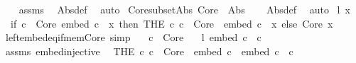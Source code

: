 \begin{isabellebody}
%
\isadelimproof
\ \ %
\endisadelimproof
%
\isatagproof
{}\isamarkupfalse%
\ assms\ \isamarkupfalse%
\ Abs{\isacharunderscore}{\kern0pt}def\ \isamarkupfalse%
\ auto%
\endisatagproof
{\isafoldproof}%
%
\isadelimproof
\isanewline
%
\endisadelimproof
\isanewline
{}\isamarkupfalse%
\ Core{\isacharunderscore}{\kern0pt}subset{\isacharunderscore}{\kern0pt}Abs{\isacharcolon}{\kern0pt}\ {\isachardoublequoteopen}Core\ {\isasymsubseteq}\ Abs{\isachardoublequoteclose}\isanewline
%
\isadelimproof
\ \ %
\endisadelimproof
%
\isatagproof
{}\isamarkupfalse%
\ Abs{\isacharunderscore}{\kern0pt}def\ \isamarkupfalse%
\ auto%
\endisatagproof
{\isafoldproof}%
%
\isadelimproof
\isanewline
%
\endisadelimproof
\isanewline
{}\isamarkupfalse%
\ {\isachardoublequoteopen}l\ x\ {\isasymequiv}\isanewline
\ \ if\ {\isacharparenleft}{\kern0pt}{\isasymexists}c\ {\isasymin}\ Core{\isachardot}{\kern0pt}\ embed\ c\ {\isacharequal}{\kern0pt}\ x{\isacharparenright}{\kern0pt}\ then\ {\isacharparenleft}{\kern0pt}THE\ c{\isachardot}{\kern0pt}\ c\ {\isasymin}\ Core\ {\isasymand}\ embed\ c\ {\isacharequal}{\kern0pt}\ x{\isacharparenright}{\kern0pt}\ else\ {\isasymlangle}Core{\isacharcomma}{\kern0pt}\ x{\isasymrangle}{\isachardoublequoteclose}\isanewline
\isanewline
{}\isamarkupfalse%
\ left{\isacharunderscore}{\kern0pt}embed{\isacharunderscore}{\kern0pt}eq{\isacharunderscore}{\kern0pt}if{\isacharunderscore}{\kern0pt}mem{\isacharunderscore}{\kern0pt}Core\ {\isacharbrackleft}{\kern0pt}simp{\isacharbrackright}{\kern0pt}{\isacharcolon}{\kern0pt}\isanewline
\ \ \ {\isachardoublequoteopen}c\ {\isasymin}\ Core{\isachardoublequoteclose}\isanewline
\ \ \ {\isachardoublequoteopen}l\ {\isacharparenleft}{\kern0pt}embed\ c{\isacharparenright}{\kern0pt}\ {\isacharequal}{\kern0pt}\ c{\isachardoublequoteclose}\isanewline
%
\isadelimproof
%
\endisadelimproof
%
\isatagproof
{}\isamarkupfalse%
\ {\isacharminus}{\kern0pt}\isanewline
\ \ \isamarkupfalse%
\ assms\ embed{\isacharunderscore}{\kern0pt}injective\ \isamarkupfalse%
\ {\isachardoublequoteopen}{\isacharparenleft}{\kern0pt}THE\ c{\isacharprime}{\kern0pt}{\isachardot}{\kern0pt}\ c{\isacharprime}{\kern0pt}\ {\isasymin}\ Core\ {\isasymand}\ embed\ c{\isacharprime}{\kern0pt}\ {\isacharequal}{\kern0pt}\ embed\ c{\isacharparenright}{\kern0pt}\ {\isacharequal}{\kern0pt}\ c{\isachardoublequoteclose}\isanewline
\ \ \ \ \isamarkupfalse%

\end{isabellebody}
